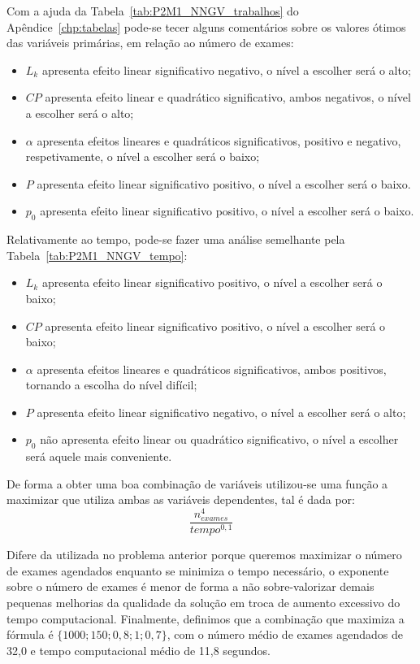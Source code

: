 Com a ajuda da Tabela~\ref{tab:P2M1_NNGV_trabalhos} do Apêndice~\ref{chp:tabelas} pode-se tecer alguns comentários sobre os valores ótimos das variáveis primárias, em relação ao número de exames:
\begin{itemize}
\item $L_{k}$ apresenta efeito linear significativo negativo, o nível a escolher será o alto;
\item $CP$ apresenta efeito linear e quadrático significativo, ambos negativos, o nível a escolher será o alto;
\item $\alpha$ apresenta efeitos lineares e quadráticos significativos, positivo e negativo, respetivamente, o nível a escolher será o baixo;
\item $P$ apresenta efeito linear significativo positivo, o nível a escolher será o baixo.
\item $p_{0}$ apresenta efeito linear significativo positivo, o nível a escolher será o baixo.
\end{itemize}
Relativamente ao tempo, pode-se fazer uma análise semelhante pela Tabela~\ref{tab:P2M1_NNGV_tempo}:
\begin{itemize}
\item $L_{k}$ apresenta efeito linear significativo positivo, o nível a escolher será o baixo;
\item $CP$ apresenta efeito linear significativo positivo, o nível a escolher será o baixo;
\item $\alpha$ apresenta efeitos lineares e quadráticos significativos, ambos positivos, tornando a escolha do nível difícil;
\item $P$ apresenta efeito linear significativo negativo, o nível a escolher será o alto;
\item $p_{0}$ não apresenta efeito linear ou quadrático significativo, o nível a escolher será aquele mais conveniente.
\end{itemize}

De forma a obter uma boa combinação de variáveis utilizou-se uma função a maximizar que utiliza ambas as variáveis dependentes, tal é dada por:\\
$$\frac{n_{exames}^{4}}{tempo^{0,1}}$$

Difere da utilizada no problema anterior porque queremos maximizar o número de exames agendados enquanto se minimiza o tempo necessário, o exponente sobre o número de exames é menor de forma a não sobre-valorizar demais pequenas melhorias da qualidade da solução em troca de aumento excessivo do tempo computacional. Finalmente, definimos que a combinação que maximiza a fórmula é $\{1000; 150; 0,8; 1; 0,7\}$, com o número médio de exames agendados de 32,0 e tempo computacional médio de 11,8 segundos.\\


